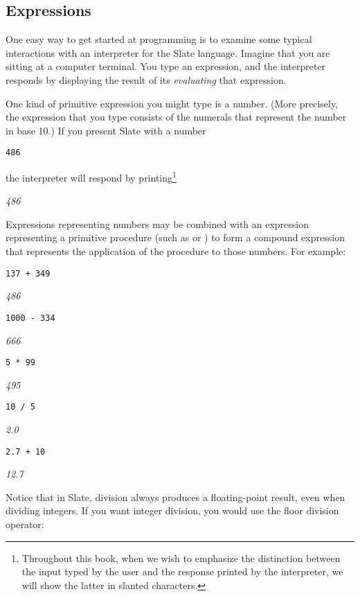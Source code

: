 \subsection{Expressions}

One easy way to get started at programming is to examine some typical interactions with an interpreter for the Slate language. Imagine that you are sitting at a computer terminal. You type an expression, and the interpreter responds by displaying the result of its \textit{evaluating} that expression.

One kind of primitive expression you might type is a number. (More precisely, the expression that you type consists of the numerals that represent the number in base 10.) If you present Slate with a number

\begin{lstlisting}
486
\end{lstlisting}

the interpreter will respond by printing\footnote{Throughout this book, when we wish to emphasize the distinction between the input typed by the user and the response printed by the interpreter, we will show the latter in slanted characters.}

\textit{486}

Expressions representing numbers may be combined with an expression representing a primitive procedure (such as \slate{+} or \slate{*}) to form a compound expression that represents the application of the procedure to those numbers. For example:

\begin{lstlisting}
137 + 349
\end{lstlisting}
\textit{486}

\begin{lstlisting}
1000 - 334
\end{lstlisting}
\textit{666}

\begin{lstlisting}
5 * 99
\end{lstlisting}
\textit{495}

\begin{lstlisting}
10 / 5
\end{lstlisting}
\textit{2.0}

\begin{lstlisting}
2.7 + 10
\end{lstlisting}
\textit{12.7}

Notice that in Slate, division always produces a floating-point result, even when dividing integers. If you want integer division, you would use the floor division operator:

